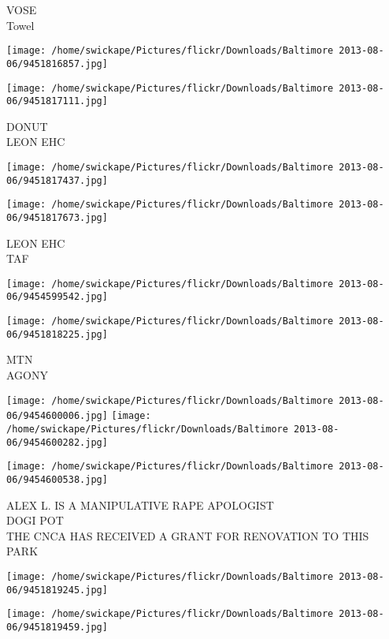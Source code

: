 \documentclass[10pt,letterpaper]{article}
\begin{document}
VOSE\\
Towel
\pagebreak

\texttt{[image: /home/swickape/Pictures/flickr/Downloads/Baltimore 2013-08-06/9451816857.jpg]}

\vspace{0.25in}
\texttt{[image: /home/swickape/Pictures/flickr/Downloads/Baltimore 2013-08-06/9451817111.jpg]}

DONUT\\
LEON EHC
\pagebreak

\texttt{[image: /home/swickape/Pictures/flickr/Downloads/Baltimore 2013-08-06/9451817437.jpg]}

\vspace{0.25in}
\texttt{[image: /home/swickape/Pictures/flickr/Downloads/Baltimore 2013-08-06/9451817673.jpg]}

LEON EHC\\
TAF
\pagebreak

\texttt{[image: /home/swickape/Pictures/flickr/Downloads/Baltimore 2013-08-06/9454599542.jpg]}

\vspace{0.25in}
\texttt{[image: /home/swickape/Pictures/flickr/Downloads/Baltimore 2013-08-06/9451818225.jpg]}

MTN\\
AGONY
\pagebreak

\texttt{[image: /home/swickape/Pictures/flickr/Downloads/Baltimore 2013-08-06/9454600006.jpg]}
\texttt{[image: /home/swickape/Pictures/flickr/Downloads/Baltimore 2013-08-06/9454600282.jpg]}

\vspace{0.25in}
\texttt{[image: /home/swickape/Pictures/flickr/Downloads/Baltimore 2013-08-06/9454600538.jpg]}

ALEX L. IS A MANIPULATIVE RAPE APOLOGIST\\
DOGI POT\\
THE CNCA HAS RECEIVED A GRANT FOR RENOVATION TO THIS PARK
\pagebreak

\texttt{[image: /home/swickape/Pictures/flickr/Downloads/Baltimore 2013-08-06/9451819245.jpg]}

\vspace{0.25in}
\texttt{[image: /home/swickape/Pictures/flickr/Downloads/Baltimore 2013-08-06/9451819459.jpg]}
\end{document}
